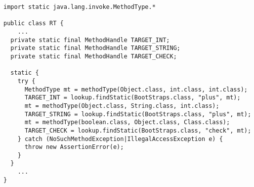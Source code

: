 {\tiny \begin{verbatim}
import static java.lang.invoke.MethodType.*

public class RT {
    ...
  private static final MethodHandle TARGET_INT;
  private static final MethodHandle TARGET_STRING;
  private static final MethodHandle TARGET_CHECK;

  static {
    try {
      MethodType mt = methodType(Object.class, int.class, int.class);
      TARGET_INT = lookup.findStatic(BootStraps.class, "plus", mt);
      mt = methodType(Object.class, String.class, int.class);
      TARGET_STRING = lookup.findStatic(BootStraps.class, "plus", mt);
      mt = methodType(boolean.class, Object.class, Class.class);
      TARGET_CHECK = lookup.findStatic(BootStraps.class, "check", mt);
    } catch (NoSuchMethodException|IllegalAccessException e) {
      throw new AssertionError(e);
    }
  }
    ...
}
\end{verbatim} }